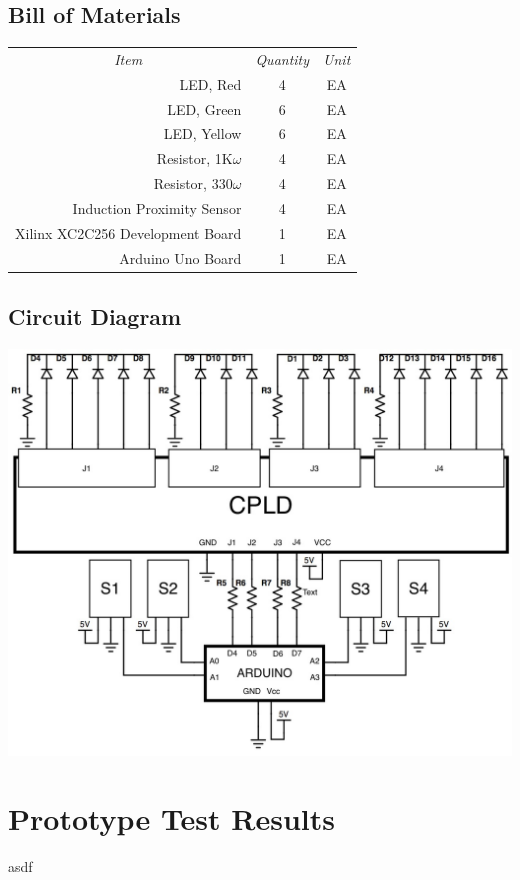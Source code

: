 \subsection{Bill of Materials}
\begin{table}[h]
\centering
\begin{tabular}{rcc}
\multicolumn{1}{c}{\textit{Item}} & \textit{Quantity} & \textit{Unit} \\
LED, Red & 4 & EA \\
LED, Green & 6 & EA \\
LED, Yellow & 6 & EA \\
Resistor, 1K$\omega$ & 4 & EA \\
Resistor, 330$\omega$ & 4 & EA \\
Induction Proximity Sensor & 4 & EA \\
Xilinx XC2C256 Development Board & 1 & EA \\
Arduino Uno Board & 1 & EA
\end{tabular}
\end{table}

\subsection{Circuit Diagram}
\includegraphics[scale=0.20]{0623151841.jpg}

\section{Prototype Test Results}
asdf
